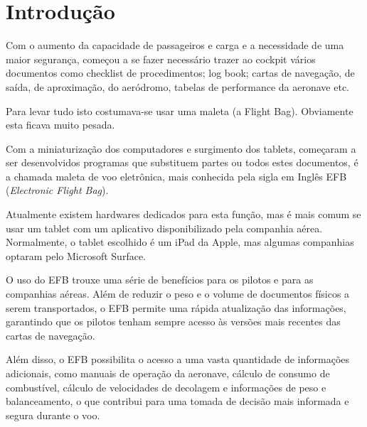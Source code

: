 \chapter{Introdução}
Com o aumento da capacidade de passageiros e carga e a necessidade 
de uma maior segurança, começou a se fazer necessário trazer ao cockpit 
vários documentos como checklist de procedimentos; log book; cartas de 
navegação, de saída, de aproximação, do aeródromo, tabelas de performance
 da aeronave etc.

Para levar tudo isto costumava-se usar uma maleta (a Flight Bag). Obviamente 
esta ficava muito pesada.

Com a miniaturização dos computadores e surgimento dos tablets, começaram a ser 
desenvolvidos programas que substituem partes ou todos estes documentos, é a
chamada maleta de voo eletrônica, mais conhecida pela sigla em Inglês EFB 
(\textit{Electronic Flight Bag}).

Atualmente existem hardwares dedicados para esta função, mas é mais comum se 
usar um tablet com um aplicativo disponibilizado pela companhia aérea. Normalmente, 
o tablet escolhido é um iPad da Apple, mas algumas companhias optaram pelo 
Microsoft Surface. \cite{surface}

O uso do EFB trouxe uma série de benefícios para os pilotos e para as companhias
aéreas. Além de reduzir o peso e o volume de documentos físicos a serem 
transportados, o EFB permite uma rápida atualização das informações, garantindo
 que os pilotos tenham sempre acesso às versões mais recentes das cartas de 
 navegação. \cite{EFB-more-than}

Além disso, o EFB possibilita o acesso a uma vasta quantidade de informações 
adicionais, como manuais de operação da aeronave, cálculo de consumo de combustível,
cálculo de velocidades de decolagem e informações de peso e balanceamento, o que 
contribui para uma tomada de decisão mais informada e segura durante o voo.
